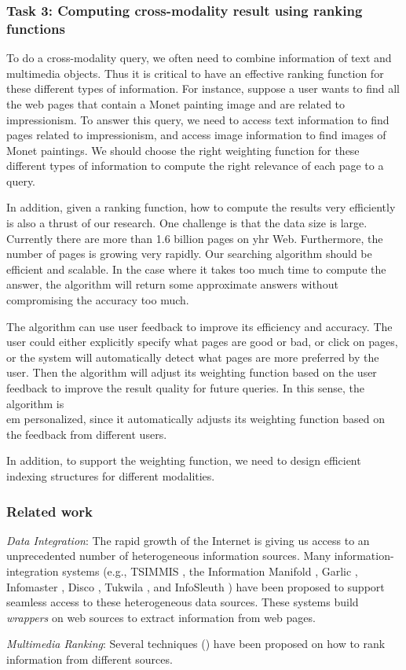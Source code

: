 \subsubsection*{Task 3: Computing cross-modality result using ranking functions}

To do a cross-modality query, we often need to combine information of text
and multimedia objects.  Thus it is critical to have an effective ranking
function for these different types of information.  For instance, suppose
a user wants to find all the web pages that contain a Monet painting image
and are related to impressionism.  To answer this query, we need to access
text information to find pages related to impressionism, and access image
information to find images of Monet paintings.  We should choose the right
weighting function for these different types of information to compute the
right relevance of each page to a query.

In addition, given a ranking function, how to compute the results very
efficiently is also a thrust of our research.  One challenge is that the
data size is large.  Currently there are more than 1.6 billion pages on
yhr Web.  Furthermore, the number of pages is growing very rapidly.  Our
searching algorithm should be efficient and scalable.  In the case where
it takes too much time to compute the answer, the algorithm will return
some approximate answers without compromising the accuracy too much.

The algorithm can use user feedback to improve its efficiency and
accuracy.  The user could either explicitly specify what pages are good or
bad, or click on pages, or the system will automatically detect what pages
are more preferred by the user.  Then the algorithm will adjust its
weighting function based on the user feedback to improve the result
quality for future queries.  In this sense, the algorithm is {\\em
personalized}, since it automatically adjusts its weighting function based
on the feedback from different users.

In addition, to support the weighting function, we need to design
efficient indexing structures for different modalities.

\subsubsection*{Related work}

{\em Data Integration}: The rapid growth of the Internet is giving us
access to an unprecedented number of heterogeneous information sources.
Many information-integration systems (e.g., TSIMMIS \cite{Chawathe94-1},
the Information Manifold \cite{Levy96-1}, Garlic \cite{Roth97-1},
Infomaster \cite{Genesereth97-1}, Disco \cite{Tomasic98-1}, Tukwila
\cite{Ives99-1}, and InfoSleuth \cite{Bayardo97-1}) have been proposed to
support seamless access to these heterogeneous data sources.  These
systems build {\em wrappers} on web sources to extract information from
web pages.

{\em Multimedia Ranking}: Several techniques (\cite{Fagin,Gravano,Chang})
have been proposed on how to rank information from different sources.



